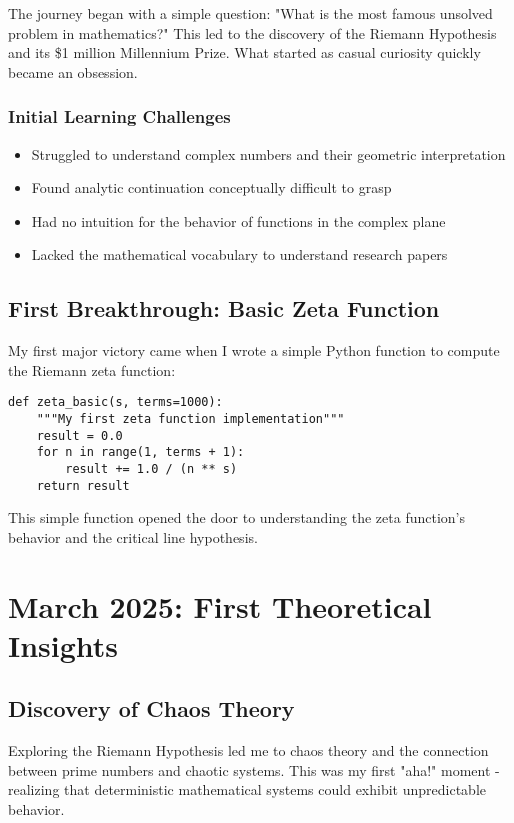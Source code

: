 \documentclass[12pt]{article}
\begin{document}
The journey began with a simple question: "What is the most famous unsolved problem in mathematics?" This led to the discovery of the Riemann Hypothesis and its \$1 million Millennium Prize. What started as casual curiosity quickly became an obsession.

\subsubsection{Initial Learning Challenges}
\begin{itemize}
    \item Struggled to understand complex numbers and their geometric interpretation
    \item Found analytic continuation conceptually difficult to grasp
    \item Had no intuition for the behavior of functions in the complex plane
    \item Lacked the mathematical vocabulary to understand research papers
\end{itemize}

\subsection{First Breakthrough: Basic Zeta Function}

My first major victory came when I wrote a simple Python function to compute the Riemann zeta function:

\begin{lstlisting}
def zeta_basic(s, terms=1000):
    """My first zeta function implementation"""
    result = 0.0
    for n in range(1, terms + 1):
        result += 1.0 / (n ** s)
    return result
\end{lstlisting}

This simple function opened the door to understanding the zeta function's behavior and the critical line hypothesis.

\section{March 2025: First Theoretical Insights}

\subsection{Discovery of Chaos Theory}

Exploring the Riemann Hypothesis led me to chaos theory and the connection between prime numbers and chaotic systems. This was my first "aha!" moment - realizing that deterministic mathematical systems could exhibit unpredictable behavior.
\end{document}
